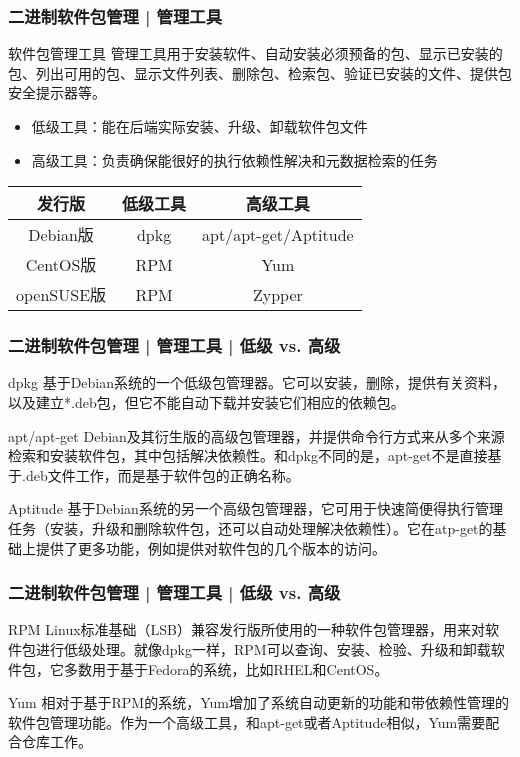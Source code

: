 \begin{frame}
  \frametitle{二进制软件包管理 | 管理工具}
  \begin{block}{软件包管理工具}
  管理工具用于安装软件、自动安装必须预备的包、显示已安装的包、列出可用的包、显示文件列表、删除包、检索包、验证已安装的文件、提供包安全提示器等。
  \begin{itemize}
    \item 低级工具：能在后端实际安装、升级、卸载软件包文件
    \item 高级工具：负责确保能很好的执行依赖性解决和元数据检索的任务
  \end{itemize}
  \end{block}
  \pause
  \begin{table}
    \centering
    \begin{tabularx}{0.658\textwidth}{ccc}
      \hline
      \rowcolor{blue!50}发行版 & 低级工具 & 高级工具\\
      \hline
      Debian版 & dpkg & apt/apt-get/Aptitude\\
      CentOS版 & RPM & Yum\\
      openSUSE版 & RPM & Zypper\\
      \hline
    \end{tabularx}
  \end{table}
\end{frame}

\begin{frame}
  \frametitle{二进制软件包管理 | 管理工具 | 低级 vs. 高级}
  \begin{block}{dpkg}
    基于Debian系统的一个低级包管理器。它可以安装，删除，提供有关资料，以及建立*.deb包，但它不能自动下载并安装它们相应的依赖包。
  \end{block}
  \pause
  \begin{block}{apt/apt-get}
    Debian及其衍生版的高级包管理器，并提供命令行方式来从多个来源检索和安装软件包，其中包括解决依赖性。和dpkg不同的是，apt-get不是直接基于.deb文件工作，而是基于软件包的正确名称。
  \end{block}
  \pause
  \begin{block}{Aptitude}
    基于Debian系统的另一个高级包管理器，它可用于快速简便得执行管理任务（安装，升级和删除软件包，还可以自动处理解决依赖性）。它在atp-get的基础上提供了更多功能，例如提供对软件包的几个版本的访问。
  \end{block}
\end{frame}

\begin{frame}
  \frametitle{二进制软件包管理 | 管理工具 | 低级 vs. 高级}
  \begin{block}{RPM}
    Linux标准基础（LSB）兼容发行版所使用的一种软件包管理器，用来对软件包进行低级处理。就像dpkg一样，RPM可以查询、安装、检验、升级和卸载软件包，它多数用于基于Fedora的系统，比如RHEL和CentOS。
  \end{block}
  \pause
  \begin{block}{Yum}
    相对于基于RPM的系统，Yum增加了系统自动更新的功能和带依赖性管理的软件包管理功能。作为一个高级工具，和apt-get或者Aptitude相似，Yum需要配合仓库工作。
  \end{block}
\end{frame}


